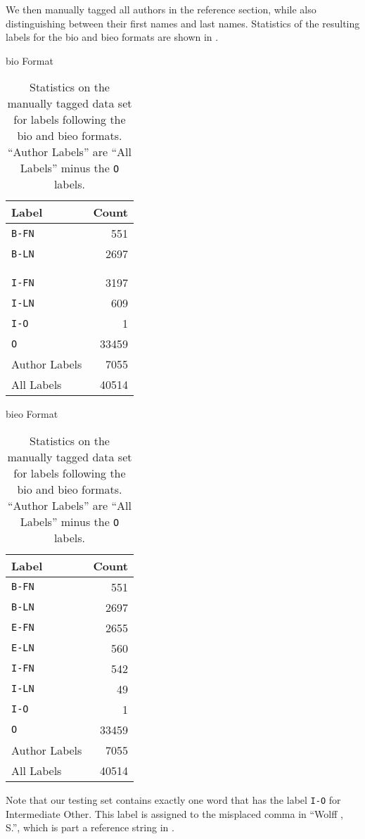 We then manually tagged all authors in the reference section, while also distinguishing between their first names and last names.
Statistics of the resulting labels for the \gls{bio} and \gls{bieo} formats are shown in .
\begin{table}[t]
\centering
\begin{minipage}[t]{0.3\linewidth}
\centering
\gls{bio} Format\par
\smallskip
\begin{tabular}{l r}
  \toprule
  Label & Count\\
  \midrule
  \texttt{B-FN}    & 551\\
  \texttt{B-LN}    & 2697\\
                   & \\
                   & \\
  \texttt{I-FN}    & 3197\\
  \texttt{I-LN}    & 609\\
  \texttt{I-O}     & 1\\
  \texttt{O}       & 33459\\
  \midrule
  Author Labels    & 7055\\
  All Labels       & 40514\\
  \bottomrule
\end{tabular}
\end{minipage}
\quad
\begin{minipage}[t]{0.3\linewidth}
\centering
\gls{bieo} Format\par
\smallskip
\begin{tabular}{l r}
  \toprule
  Label & Count\\
  \midrule
  \texttt{B-FN}    & 551\\
  \texttt{B-LN}    & 2697\\
  \texttt{E-FN}    & 2655\\
  \texttt{E-LN}    & 560\\
  \texttt{I-FN}    & 542\\
  \texttt{I-LN}    & 49\\
  \texttt{I-O}     & 1\\
  \texttt{O}       & 33459\\
  \midrule
  Author Labels    & 7055\\
  All Labels       & 40514\\
  \bottomrule
\end{tabular}
\end{minipage}
\caption{Statistics on the manually tagged data set for labels following the \gls{bio} and \gls{bieo} formats. ``Author Labels'' are ``All Labels'' minus the \texttt{O} labels.}
\label{tab:statistics-manually-tagged}
\end{table}
Note that our testing set contains exactly one word that has the label \texttt{I-O} for Intermediate Other.
This label is assigned to the misplaced comma in ``Wolff , S.'', which is part a reference string in \citet{morth1998spurensuche}.

